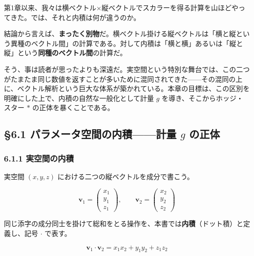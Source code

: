 \documentclass[a4paper,12pt,openany]{book}
\begin{document}
第1章以来、我々は横ベクトル×縦ベクトルでスカラーを得る計算を山ほどやってきた。では、それと内積は何が違うのか。

結論から言えば、\textbf{まったく別物}だ。横ベクトル掛ける縦ベクトルは「横と縦という異種のベクトル間」の計算である。対して内積は「横と横」あるいは「縦と縦」という\textbf{同種のベクトル間}の計算だ。

そう、事は読者が思ったよりも深遠だ。実空間という特別な舞台では、この二つがたまたま同じ数値を返すことが多いために混同されてきた——その混同の上に、ベクトル解析という巨大な体系が築かれている。本章の目標は、この区別を明確にした上で、内積の自然な一般化として計量
\(g\) を導き、そこからホッジ・スター \(\ast\) の正体を暴くことである。

\par\vspace{0.35em}\par

\hypertarget{ux30d1ux30e9ux30e1ux30fcux30bfux7a7aux9593ux306eux5185ux7a4dux8a08ux91cf-g-ux306eux6b63ux4f53}{%
\subsection{\texorpdfstring{§6.1 パラメータ空間の内積——計量 \(g\)
の正体}{§6.1 パラメータ空間の内積——計量 g の正体}}\label{ux30d1ux30e9ux30e1ux30fcux30bfux7a7aux9593ux306eux5185ux7a4dux8a08ux91cf-g-ux306eux6b63ux4f53}}

\hypertarget{ux5b9fux7a7aux9593ux306eux5185ux7a4d}{%
\subsubsection{6.1.1
実空間の内積}\label{ux5b9fux7a7aux9593ux306eux5185ux7a4d}}

実空間 \((x,y,z)\) における二つの縦ベクトルを成分で書こう。

\[\mathbf{v}_1 = \begin{pmatrix} x_1 \\ y_1 \\ z_1 \end{pmatrix},\qquad \mathbf{v}_2 = \begin{pmatrix} x_2 \\ y_2 \\ z_2 \end{pmatrix}\]

同じ添字の成分同士を掛けて総和をとる操作を、本書では\textbf{内積}（ドット積）と定義し、記号
\(\cdot\) で表す。

\[\mathbf{v}_1 \cdot \mathbf{v}_2 = x_1 x_2 + y_1 y_2 + z_1 z_2\]
\end{document}
